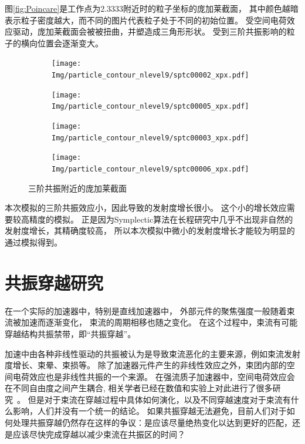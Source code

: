 图\eqref{fig:Poincare}是工作点为2.3333附近时的粒子坐标的庞加莱截面，
其中颜色越暗表示粒子密度越大，而不同的图片代表粒子处于不同的初始位置。
受空间电荷效应驱动，庞加莱截面会被被扭曲，并塑造成三角形形状。
受到三阶共振影响的粒子的横向位置会逐渐变大。

\begin{figure}[!htb]
    \centering
    \begin{subfigure}[b]{0.48\textwidth}
        \texttt{[image: Img/particle\_contour\_nlevel9/sptc00002\_xpx.pdf]}
        \caption{}
    \end{subfigure}
    \begin{subfigure}[b]{0.48\textwidth}
        \texttt{[image: Img/particle\_contour\_nlevel9/sptc00005\_xpx.pdf]}
        \caption{}
    \end{subfigure}
    \begin{subfigure}[b]{0.48\textwidth}
        \texttt{[image: Img/particle\_contour\_nlevel9/sptc00003\_xpx.pdf]}
        \caption{}
    \end{subfigure}
    \begin{subfigure}[b]{0.48\textwidth}
        \texttt{[image: Img/particle\_contour\_nlevel9/sptc00006\_xpx.pdf]}
        \caption{}
    \end{subfigure}
    \caption{三阶共振附近的庞加莱截面}\label{fig:Poincare}
\end{figure}
本次模拟的三阶共振效应小，因此导致的发射度增长很小。
这个小的增长效应需要较高精度的模拟。
正是因为Symplectic算法在长程研究中几乎不出现非自然的发射度增长，其精确度较高，
所以本次模拟中微小的发射度增长才能较为明显的通过模拟得到。

\section{共振穿越研究}            \label{section:Resonance_crossing}
在一个实际的加速器中，特别是直线加速器中，
外部元件的聚焦强度一般随着束流被加速而逐渐变化，
束流的周期相移也随之变化。
在这个过程中，束流有可能穿越结构共振禁带，即“共振穿越”。

加速中由各种非线性驱动的共振被认为是导致束流恶化的主要来源，例如束流发射度增长、束晕、束损等。
除了加速器元件产生的非线性效应之外，束团内部的空间电荷效应也是非线性共振的一个来源。
在强流质子加速器中，空间电荷效应会在不同自由度之间产生耦合,
相关学者已经在数值和实验上对此进行了很多研究~\cite{accelerator2013chao,accelerator2004lee,reiser2008theory}。
但是对于束流在穿越过程中具体如何演化，以及不同穿越速度对于束流有什么影响，人们并没有一个统一的结论。
如果共振穿越无法避免，目前人们对于如何处理共振穿越仍然存在这样的争议：是应该尽量绝热变化以达到更好的匹配，还是应该尽快完成穿越以减少束流在共振区的时间？

